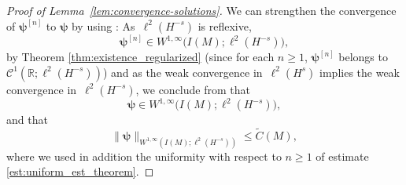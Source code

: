 \documentclass[12pt,a4paper]{amsart}
\numberwithin{equation}{section}
\newcommand{\ulpsi}{\boldsymbol{\psi}}
\begin{document}
\begin{proof}[Proof of Lemma~\ref{lem:convergence-solutions}]
		We can strengthen the convergence of $\ulpsi^{[n]}$ to $\ulpsi$ by using \cite[Remark 1.3.13 ii)]{cazenave2003semilinear}: As~$ \ell^2(H^{-s}) $ is reflexive,
		\begin{equation}
			\ulpsi^{[n]} \in W^{1,\infty}\big(I(M); \ell^2(H^{-s})\big), 
		\end{equation}
		by Theorem \ref{thm:existence_regularized}  (since for each $ n \geq 1$, $\ulpsi^{[n]}$ belongs to $\mathscr{C}^1(\mathbb{R};\ell^2(H^{-s})) $) and as the weak convergence in~$ \ell^2(H^{s}) $ implies the weak convergence in~$\ell^2(H^{-s})$, 
		we conclude from \cite[Remark 1.3.13 ii)]{cazenave2003semilinear} that  
		\begin{equation}
			\ulpsi \in W^{1,\infty}\big(I(M);\ell^2(H^{-s})\big) , 
		\end{equation}
		and that
		\begin{equation}
			\| \ulpsi \|_{W^{1,\infty}(I(M);\ell^2(H^{-s}))} \leq \tilde{C}(M) ,
		\end{equation}
		where we used in addition the uniformity with respect to $ n \geq 1$ of estimate \eqref{est:uniform_est_theorem}.
		

\end{proof}
\end{document}

